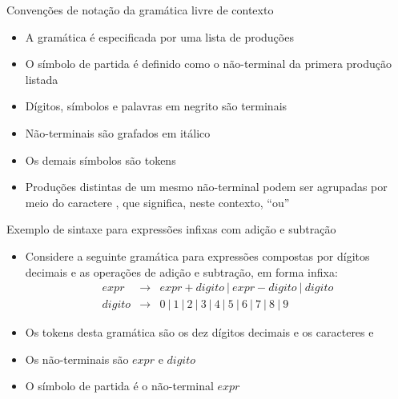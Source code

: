\begin{frame}[fragile]{Convenções de notação da gramática livre de contexto}

    \begin{itemize}
        \item A gramática é especificada por uma lista de produções
        \pause

        \item O símbolo de partida é definido como o não-terminal da primera produção listada
        \pause

        \item Dígitos, símbolos e palavras em negrito são terminais
        \pause

        \item Não-terminais são grafados em itálico
        \pause

        \item Os demais símbolos são tokens
        \pause

        \item Produções distintas de um mesmo não-terminal podem ser agrupadas por meio do caractere , que significa, neste contexto, ``ou''
    \end{itemize}

\end{frame}

\begin{frame}[fragile]{Exemplo de sintaxe para expressões infixas com adição e subtração}

    \begin{itemize}
        \item Considere a seguinte gramática para expressões compostas por dígitos decimais e as operações de adição e subtração, em forma infixa:
    \[
        \begin{array}{rcl}
            expr & \to & expr + digito\ |\ expr - digito\ |\ digito \\
            digito & \to & 0 \ | \  1 \ | \  2 \ | \  3 \ | \  4 \ | \  5 \ | \  6 \ | \  7 \ | \  8 \ | \  9
        \end{array}
    \]
    \pause

        \item Os tokens desta gramática são os dez dígitos decimais e os caracteres  e 
        \pause

        \item Os não-terminais são $expr$ e $digito$
        \pause

        \item O símbolo de partida é o não-terminal $expr$
    \end{itemize}

\end{frame}

